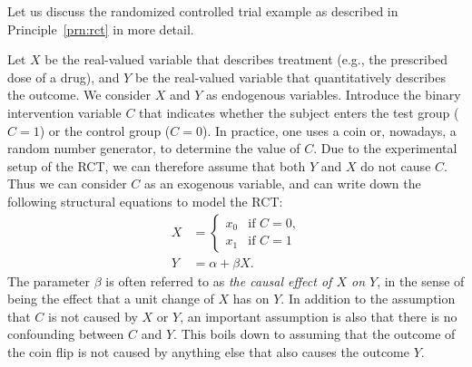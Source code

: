 Let us discuss the randomized controlled trial example as described in Principle~\ref{prn:rct} in more detail.
\begin{Eg}
Let $X$ be the real-valued variable that describes treatment (e.g., the prescribed dose of a drug), and $Y$ be the real-valued variable that quantitatively describes the outcome.
We consider $X$ and $Y$ as endogenous variables.
Introduce the binary intervention variable $C$ that indicates whether the subject enters the test group ($C=1$) or the control group ($C=0$). 
In practice, one uses a coin or, nowadays, a random number generator, to determine the value of $C$. 
Due to the experimental setup of the RCT, we can therefore assume that both $Y$ and $X$ do not cause $C$. 
Thus we can consider $C$ as an exogenous variable, and can write down the following structural equations to model the RCT:
  \begin{align*}
    X &= \begin{cases}
      x_0 & \text{if $C=0$,} \\
      x_1 & \text{if $C=1$} 
    \end{cases} \\
    Y &= \alpha + \beta X.
  \end{align*}
The parameter $\beta$ is often referred to as \emph{the causal effect of $X$ on $Y$}, in the sense
of being the effect that a unit change of $X$ has on $Y$.
In addition to the assumption that $C$ is not caused by $X$ or $Y$, an important assumption is
also that there is no confounding between $C$ and $Y$. This boils down to assuming that the outcome
of the coin flip is not caused by anything else that also causes the outcome $Y$.
\end{Eg}


